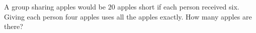 A group sharing apples would be $20$ apples short if each person received six. Giving each person four apples uses all the apples exactly. How many apples are there?
